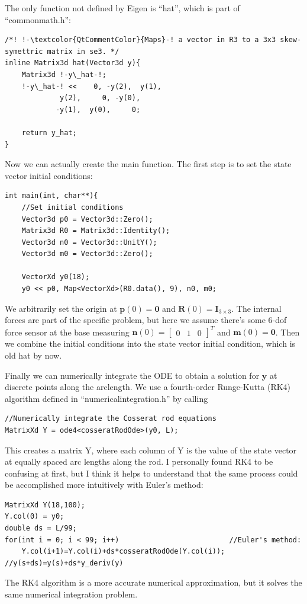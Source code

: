 \documentclass[12pt]{article}
\begin{document}
The only function not defined by Eigen is ``hat'', which is part of ``commonmath.h'':
\begin{lstlisting}
/*! !-\textcolor{QtCommentColor}{Maps}-! a vector in R3 to a 3x3 skew-symettric matrix in se3. */
inline Matrix3d hat(Vector3d y){
    Matrix3d !-y\_hat-!;
    !-y\_hat-! <<    0, -y(2),  y(1),
             y(2),     0, -y(0),
            -y(1),  y(0),     0;

    return y_hat;
}
\end{lstlisting}

Now we can actually create the main function. The first step is to set the state vector initial conditions:
\begin{lstlisting}
int main(int, char**){
    //Set initial conditions
    Vector3d p0 = Vector3d::Zero();
    Matrix3d R0 = Matrix3d::Identity();
    Vector3d n0 = Vector3d::UnitY();
    Vector3d m0 = Vector3d::Zero();

    VectorXd y0(18);
    y0 << p0, Map<VectorXd>(R0.data(), 9), n0, m0;
\end{lstlisting}
We arbitrarily set the origin at $\boldsymbol{p}(0) = \boldsymbol{0}$ and $\boldsymbol{R}(0) = \boldsymbol{I}_{3\times 3}$. The internal forces are part of the specific problem, but here we assume there's some 6-dof force sensor at the base measuring $\boldsymbol{n}(0) = \begin{bmatrix} 0 & 1 & 0 \end{bmatrix}^T$ and $\boldsymbol{m}(0) = \boldsymbol{0}$. Then we combine the initial conditions into the state vector initial condition, which is old hat by now.

Finally we can numerically integrate the ODE to obtain a solution for $\boldsymbol{y}$ at discrete points along the arclength. We use a fourth-order Runge-Kutta (RK4) algorithm defined in ``numericalintegration.h'' by calling
\begin{lstlisting}
//Numerically integrate the Cosserat rod equations
MatrixXd Y = ode4<cosseratRodOde>(y0, L);
\end{lstlisting}
This creates a matrix Y, where each column of Y is the value of the state vector at equally spaced arc lengths along the rod. I personally found RK4 to be confusing at first, but I think it helps to understand that the same process could be accomplished more intuitively with Euler's method:
\begin{lstlisting}
MatrixXd Y(18,100);
Y.col(0) = y0;
double ds = L/99;
for(int i = 0; i < 99; i++)                          //Euler's method:
    Y.col(i+1)=Y.col(i)+ds*cosseratRodOde(Y.col(i)); //y(s+ds)=y(s)+ds*y_deriv(y)
\end{lstlisting}
The RK4 algorithm is a more accurate numerical approximation, but it solves the same numerical integration problem.
\end{document}
